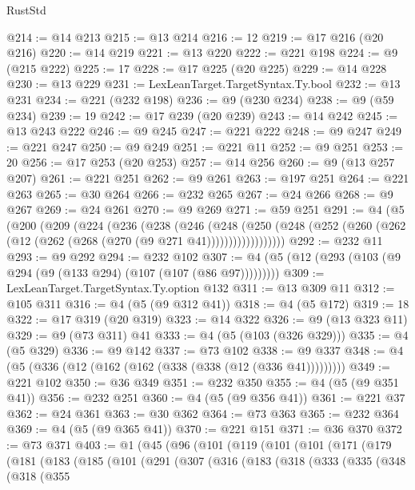 \begin{lexlean}{RustStd}
\begin{coremodule}
{\begin{coremodule}
{{{{{{{{{{{{{{{{{{{{{{{{{@214 := @14 @213
@215 := @13 @214
@216 := 12
@219 := @17 @216 (@20 @216)
@220 := @14 @219
@221 := @13 @220
@222 := @221 @198
@224 := @9 (@215 @222)
@225 := 17
@228 := @17 @225 (@20 @225)
@229 := @14 @228
@230 := @13 @229
@231 := LexLeanTarget.TargetSyntax.Ty.bool
@232 := @13 @231
@234 := @221 (@232 @198)
@236 := @9 (@230 @234)
@238 := @9 (@59 @234)
@239 := 19
@242 := @17 @239 (@20 @239)
@243 := @14 @242
@245 := @13 @243 @222
@246 := @9 @245
@247 := @221 @222
@248 := @9 @247
@249 := @221 @247
@250 := @9 @249
@251 := @221 @11
@252 := @9 @251
@253 := 20
@256 := @17 @253 (@20 @253)
@257 := @14 @256
@260 := @9 (@13 @257 @207)
@261 := @221 @251
@262 := @9 @261
@263 := @197 @251
@264 := @221 @263
@265 := @30 @264
@266 := @232 @265
@267 := @24 @266
@268 := @9 @267
@269 := @24 @261
@270 := @9 @269
@271 := @59 @251
@291 := @4
    (@5
      (@200
        (@209
          (@224
            (@236
              (@238
                (@246
                  (@248
                    (@250
                      (@248 (@252 (@260 (@262 (@12 (@262 (@268 (@270 (@9 @271 @41))))))))))))))))))
@292 := @232 @11
@293 := @9 @292
@294 := @232 @102
@307 := @4 (@5 (@12 (@293 (@103 (@9 @294 (@9 (@133 @294) (@107 (@107 (@86 @97)))))))))
@309 := LexLeanTarget.TargetSyntax.Ty.option @132
@311 := @13 @309 @11
@312 := @105 @311
@316 := @4 (@5 (@9 @312 @41))
@318 := @4 (@5 @172)
@319 := 18
@322 := @17 @319 (@20 @319)
@323 := @14 @322
@326 := @9 (@13 @323 @11)
@329 := @9 (@73 @311) @41
@333 := @4 (@5 (@103 (@326 @329)))
@335 := @4 (@5 @329)
@336 := @9 @142
@337 := @73 @102
@338 := @9 @337
@348 := @4 (@5 (@336 (@12 (@162 (@162 (@338 (@338 (@12 (@336 @41)))))))))
@349 := @221 @102
@350 := @36 @349
@351 := @232 @350
@355 := @4 (@5 (@9 @351 @41))
@356 := @232 @251
@360 := @4 (@5 (@9 @356 @41))
@361 := @221 @37
@362 := @24 @361
@363 := @30 @362
@364 := @73 @363
@365 := @232 @364
@369 := @4 (@5 (@9 @365 @41))
@370 := @221 @151
@371 := @36 @370
@372 := @73 @371
@403 := @1
    (@45
      (@96
        (@101
          (@119
            (@101
              (@101
                (@171
                  (@179
                    (@181
                      (@183
                        (@185
                          (@101
                            (@291
                              (@307
                                (@316
                                  (@183
                                    (@318
                                      (@333
                                        (@335
                                          (@348
                                            (@318
                                              (@355
}}}}}}}}}}}}}}}}}}}}}}}}}
\end{coremodule}}
\end{coremodule}
\end{lexlean}
